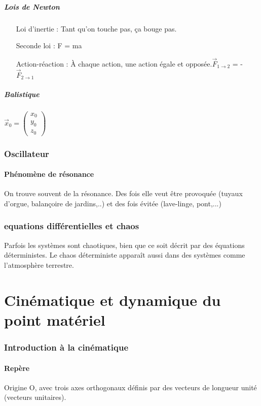 \documentclass[12pt,a4paper]{article}
\begin{document}
\subsubsection{Lois de Newton}
\begin{enumerate}
\item[Loi d'inertie :] Tant qu'on touche pas, ça bouge pas.
\item[Seconde loi :] F = ma
\item[Action-réaction :] À chaque action, une action égale et opposée.$\vec{F}_{1\rightarrow 2}$ = -$\vec{F}_{2\rightarrow 1}$
\end{enumerate}
\subsubsection{Balistique}
$\vec{x}_0 = 
\begin{pmatrix}
x_0\\
y_0\\
z_0
\end{pmatrix}$
\section{Oscillateur}
\subsection{Phénomène de résonance }
On trouve souvent de la résonance. Des fois elle veut être provoquée (tuyaux d'orgue, balançoire de jardins,..) et des fois évitée (lave-linge, pont,...)
\section{equations différentielles et chaos}
Parfois les systèmes sont chaotiques, bien que ce soit décrit par des équations déterministes. Le chaos déterministe apparaît aussi dans des systèmes comme l'atmosphère terrestre.
\part{Cinématique et dynamique du point matériel}
\section{Introduction à la cinématique}
\subsection{Repère}
Origine O, avec trois axes orthogonaux définis par des vecteurs de longueur unité (vecteurs unitaires).
\end{document}
